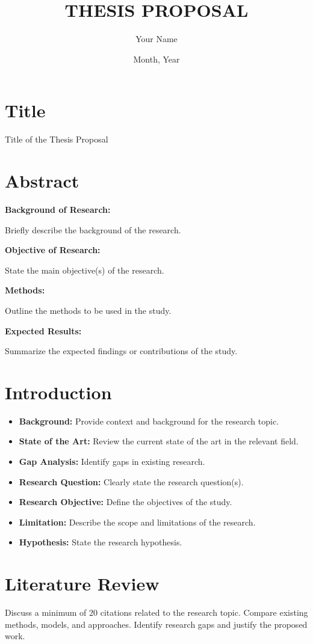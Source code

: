 \documentclass[12pt]{article}
\title{THESIS PROPOSAL}
\author{Your Name}
\date{Month, Year}
\begin{document}
\maketitle

\section*{Title}
Title of the Thesis Proposal

\section*{Abstract}
\textbf{Background of Research:}

Briefly describe the background of the research.

\textbf{Objective of Research:}

State the main objective(s) of the research.

\textbf{Methods:}

Outline the methods to be used in the study.

\textbf{Expected Results:}

Summarize the expected findings or contributions of the study.

\section{Introduction}
\begin{itemize}
  \item \textbf{Background:} Provide context and background for the research topic.
  \item \textbf{State of the Art:} Review the current state of the art in the relevant field.
  \item \textbf{Gap Analysis:} Identify gaps in existing research.
  \item \textbf{Research Question:} Clearly state the research question(s).
  \item \textbf{Research Objective:} Define the objectives of the study.
  \item \textbf{Limitation:} Describe the scope and limitations of the research.
  \item \textbf{Hypothesis:} State the research hypothesis.
\end{itemize}

\section{Literature Review}
Discuss a minimum of 20 citations related to the research topic. Compare existing methods, models, and approaches. Identify research gaps and justify the proposed work.
\end{document}
